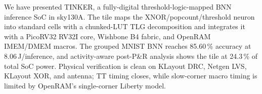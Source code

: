 \documentclass[conference]{IEEEtran}
\begin{document}
We have presented TINKER, a fully-digital threshold-logic-mapped
BNN inference SoC in sky130A. The tile maps the
XNOR/popcount/threshold neuron into standard cells with a
chunked-LUT TLG decomposition and integrates it with a PicoRV32
RV32I core, Wishbone B4 fabric, and OpenRAM IMEM/DMEM macros. The
grouped MNIST BNN reaches 85.60\,\% accuracy at
8.06\,\textmu J/inference, and activity-aware post-P\&R analysis
shows the tile at 24.3\,\% of total SoC power. Physical
verification is clean on KLayout DRC, Netgen LVS, KLayout XOR, and
antenna; TT timing closes, while slow-corner macro timing is limited
by OpenRAM's single-corner Liberty model.


\FloatBarrier


\end{document}
